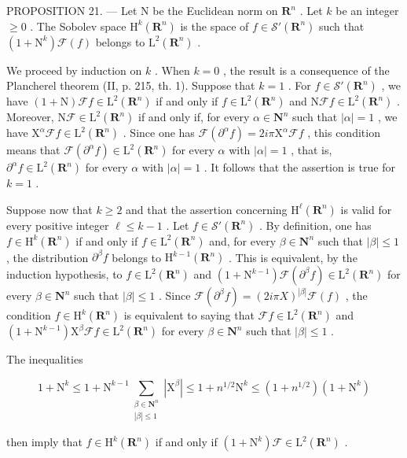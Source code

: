 PROPOSITION 21. --- Let N be the Euclidean norm on \(\mathbf{R}^{n}\) . Let \(k\) be an integer \(\geqslant 0\) . The Sobolev space \(\mathrm{H}^{k}(\mathbf{R}^{n})\) is the space of \(f \in \mathcal{S}'(\mathbf{R}^{n})\) such that \((1 + \mathrm{N}^{k})\mathcal{F}(f)\) belongs to \(\mathrm{L}^{2}(\mathbf{R}^{n})\) .

We proceed by induction on \(k\) . When \(k = 0\) , the result is a consequence of the Plancherel theorem (II, p. 215, th. 1). Suppose that \(k = 1\) . For \(f \in \mathcal{S}'(\mathbf{R}^n)\) , we have \((1 + \mathrm{N})\mathcal{F}f \in \mathrm{L}^2(\mathbf{R}^n)\) if and only if \(f \in \mathrm{L}^2(\mathbf{R}^n)\) and \(\mathrm{N}\mathcal{F}f \in \mathrm{L}^2(\mathbf{R}^n)\) . Moreover, \(\mathrm{N}\mathcal{F} \in \mathrm{L}^2(\mathbf{R}^n)\) if and only if, for every \(\alpha \in \mathbf{N}^n\) such that \(|\alpha| = 1\) , we have \(\mathrm{X}^\alpha\mathcal{F}f \in \mathrm{L}^2(\mathbf{R}^n)\) . Since one has \(\mathcal{F}(\partial^\alpha f) = 2i\pi\mathrm{X}^\alpha\mathcal{F}f\) , this condition means that \(\mathcal{F}(\partial^\alpha f) \in \mathrm{L}^2(\mathbf{R}^n)\) for every \(\alpha\) with \(|\alpha| = 1\) , that is, \(\partial^\alpha f \in \mathrm{L}^2(\mathbf{R}^n)\) for every \(\alpha\) with \(|\alpha| = 1\) . It follows that the assertion is true for \(k = 1\) .

Suppose now that \(k \geqslant 2\) and that the assertion concerning \(\mathrm{H}^{\ell}(\mathbf{R}^{n})\) is valid for every positive integer \(\ell \leqslant k - 1\) . Let \(f \in \mathcal{S}'(\mathbf{R}^{n})\) . By definition, one has \(f \in \mathrm{H}^{k}(\mathbf{R}^{n})\) if and only if \(f \in \mathrm{L}^{2}(\mathbf{R}^{n})\) and, for every \(\beta \in \mathbf{N}^{n}\) such that \(|\beta| \leqslant 1\) , the distribution \(\partial^{\beta} f\) belongs to \(\mathrm{H}^{k-1}(\mathbf{R}^{n})\) . This is equivalent, by the induction hypothesis, to \(f \in \mathrm{L}^{2}(\mathbf{R}^{n})\) and \((1 + \mathrm{N}^{k-1})\mathcal{F}(\partial^{\beta} f) \in \mathrm{L}^{2}(\mathbf{R}^{n})\) for every \(\beta \in \mathbf{N}^{n}\) such that \(|\beta| \leqslant 1\) . Since \(\mathcal{F}(\partial^{\beta} f) = (2i\pi X)^{|\beta|}\mathcal{F}(f)\) , the condition \(f \in \mathrm{H}^{k}(\mathbf{R}^{n})\) is equivalent to saying that \(\mathcal{F}f \in \mathrm{L}^{2}(\mathbf{R}^{n})\) and \((1 + \mathrm{N}^{k-1})\mathrm{X}^{\beta}\mathcal{F}f \in \mathrm{L}^{2}(\mathbf{R}^{n})\) for every \(\beta \in \mathbf{N}^{n}\) such that \(|\beta| \leqslant 1\) .

The inequalities

\[
1 + \mathrm{N}^{k}\leqslant 1 + \mathrm{N}^{k - 1}\sum_{\substack{\beta \in \mathbf{N}^{n}\\ |\beta |\leqslant 1}}|\mathrm{X}^{\beta}|\leqslant 1 + n^{1 / 2}\mathrm{N}^{k}\leqslant (1 + n^{1 / 2})(1 + \mathrm{N}^{k})
\]

then imply that \(f \in \mathrm{H}^k(\mathbf{R}^n)\) if and only if \((1 + \mathrm{N}^k)\mathcal{F} \in \mathrm{L}^2(\mathbf{R}^n)\) .

